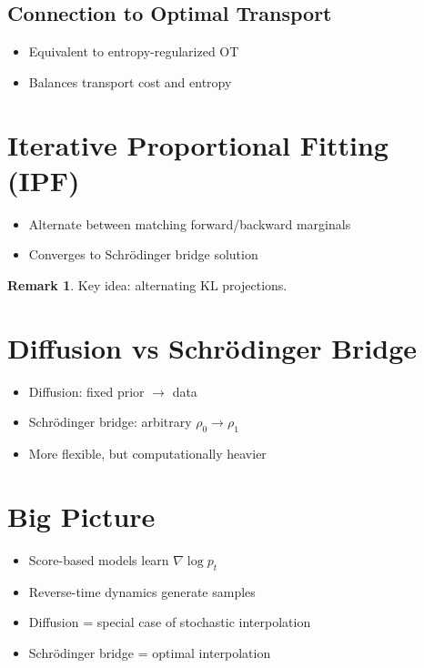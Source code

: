\documentclass[12pt,oneside]{book}
\numberwithin{equation}{section}
\theoremstyle{definition}
\newtheorem{remark}{Remark}[section]
\theoremstyle{plain}
\theoremstyle{remark}
\begin{document}
\subsection{Connection to Optimal Transport}

\begin{itemize}
    \item Equivalent to entropy-regularized OT
    \item Balances transport cost and entropy
\end{itemize}

\section{Iterative Proportional Fitting (IPF)}

\begin{itemize}
    \item Alternate between matching forward/backward marginals
    \item Converges to Schrödinger bridge solution
\end{itemize}

\begin{remark}
Key idea: alternating KL projections.
\end{remark}

\section{Diffusion vs Schrödinger Bridge}

\begin{itemize}
    \item Diffusion: fixed prior $\to$ data
    \item Schrödinger bridge: arbitrary $\rho_0 \to \rho_1$
    \item More flexible, but computationally heavier
\end{itemize}

\section{Big Picture}

\begin{itemize}
    \item Score-based models learn $\nabla \log p_t$
    \item Reverse-time dynamics generate samples
    \item Diffusion = special case of stochastic interpolation
    \item Schrödinger bridge = optimal interpolation
\end{itemize}
\end{document}
